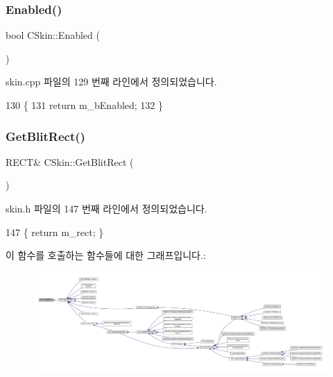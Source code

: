 \subsubsection{\texorpdfstring{Enabled()}{Enabled()}}
{\footnotesize\ttfamily bool C\+Skin\+::\+Enabled (\begin{DoxyParamCaption}{ }\end{DoxyParamCaption})}



skin.\+cpp 파일의 129 번째 라인에서 정의되었습니다.


\begin{DoxyCode}
130 \{
131   \textcolor{keywordflow}{return} m\_bEnabled;
132 \}
\end{DoxyCode}
\mbox{\label{class_c_skin_a8fe20ca67965deec6e5e29a2bf467933}} 
\subsubsection{\texorpdfstring{Get\+Blit\+Rect()}{GetBlitRect()}}
{\footnotesize\ttfamily R\+E\+CT\& C\+Skin\+::\+Get\+Blit\+Rect (\begin{DoxyParamCaption}{ }\end{DoxyParamCaption})\hspace{0.3cm}{\ttfamily [inline]}}



skin.\+h 파일의 147 번째 라인에서 정의되었습니다.


\begin{DoxyCode}
147 \{ \textcolor{keywordflow}{return} m\_rect; \}
\end{DoxyCode}
이 함수를 호출하는 함수들에 대한 그래프입니다.\+:
\nopagebreak
\begin{figure}[H]
\begin{center}
\leavevmode
\includegraphics[width=350pt]{class_c_skin_a8fe20ca67965deec6e5e29a2bf467933_icgraph}
\end{center}
\end{figure}
\mbox{\label{class_c_skin_a4112f4df38d9917d38c5db2622777c1f}} 
